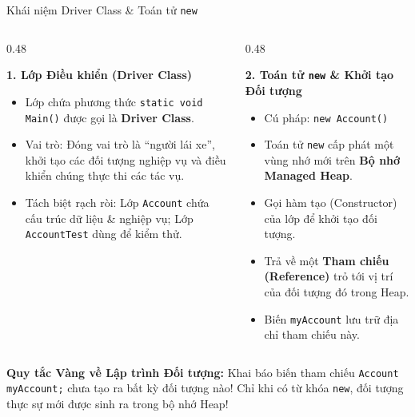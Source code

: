 \documentclass[aspectratio=169, 10pt]{beamer}
\begin{document}
\begin{frame}{Khái niệm Driver Class \& Toán tử \texttt{new}}
  \begin{columns}[T]
    \begin{column}{0.48\textwidth}
      \begin{block}{\textbf{1. Lớp Điều khiển (Driver Class)}}
        \begin{itemize}\small
          \item Lớp chứa phương thức \texttt{static void Main()} được gọi là \textbf{Driver Class}.
          \item Vai trò: Đóng vai trò là ``người lái xe'', khởi tạo các đối tượng nghiệp vụ và điều khiển chúng thực thi các tác vụ.
          \item Tách biệt rạch ròi: Lớp \texttt{Account} chứa cấu trúc dữ liệu \& nghiệp vụ; Lớp \texttt{AccountTest} dùng để kiểm thử.
        \end{itemize}
      \end{block}
    \end{column}

    \begin{column}{0.48\textwidth}
      \begin{exampleblock}{\textbf{2. Toán tử \texttt{new} \& Khởi tạo Đối tượng}}
        \begin{itemize}\small
          \item Cú pháp: \texttt{new Account()}
          \item Toán tử \texttt{new} cấp phát một vùng nhớ mới trên \textbf{Bộ nhớ Managed Heap}.
          \item Gọi hàm tạo (Constructor) của lớp để khởi tạo đối tượng.
          \item Trả về một \textbf{Tham chiếu (Reference)} trỏ tới vị trí của đối tượng đó trong Heap.
          \item Biến \texttt{myAccount} lưu trữ địa chỉ tham chiếu này.
        \end{itemize}
      \end{exampleblock}
    \end{column}
  \end{columns}
  \vspace{2mm}
  \begin{alertblock}{\textbf{Quy tắc Vàng về Lập trình Đối tượng:}}
    Khai báo biến tham chiếu \texttt{Account myAccount;} chưa tạo ra bất kỳ đối tượng nào! Chỉ khi có từ khóa \texttt{new}, đối tượng thực sự mới được sinh ra trong bộ nhớ Heap!
  \end{alertblock}
\end{frame}
\end{document}
